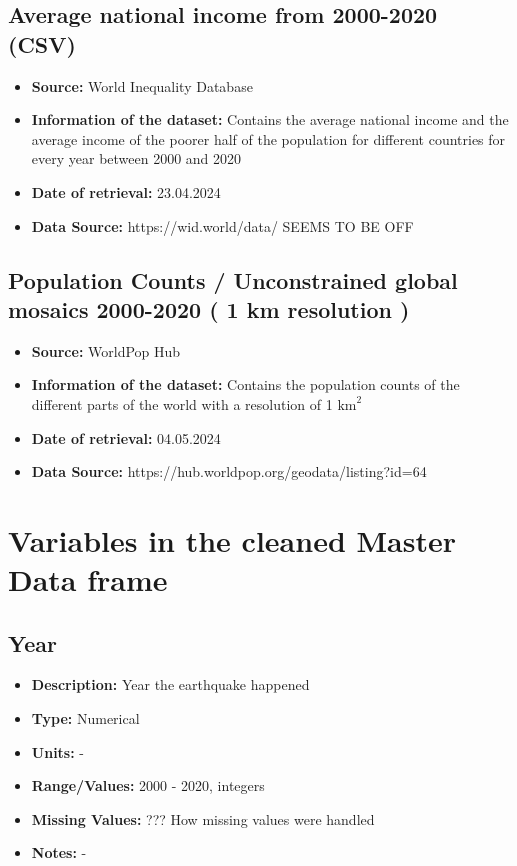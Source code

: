 \documentclass{article}
\begin{document}
\subsection{Average national income from 2000-2020 (CSV)}
\begin{itemize}
\item \textbf{Source:} World Inequality Database
\item \textbf{Information of the dataset:} Contains the average national income and the average income of the poorer half of the population for different countries for every year between 2000 and 2020
\item \textbf{Date of retrieval:} 23.04.2024
\item \textbf{Data Source:} https://wid.world/data/ SEEMS TO BE OFF
\end{itemize}

\subsection{Population Counts / Unconstrained global mosaics 2000-2020 ( 1 km resolution )}
\begin{itemize}
\item \textbf{Source:} WorldPop Hub
\item \textbf{Information of the dataset:} Contains the population counts of the different parts of the world with a resolution of 1 $\text{km}^2$
\item \textbf{Date of retrieval:} 04.05.2024
\item \textbf{Data Source:} https://hub.worldpop.org/geodata/listing?id=64
\end{itemize}

\section{Variables in the cleaned Master Data frame}

\subsection{Year}
\begin{itemize}
    \item \textbf{Description:} Year the earthquake happened
    \item \textbf{Type:} Numerical
    \item \textbf{Units:} -
    \item \textbf{Range/Values:} 2000 - 2020, integers
    \item \textbf{Missing Values:} ??? How missing values were handled
    \item \textbf{Notes:} -
\end{itemize}
\end{document}
